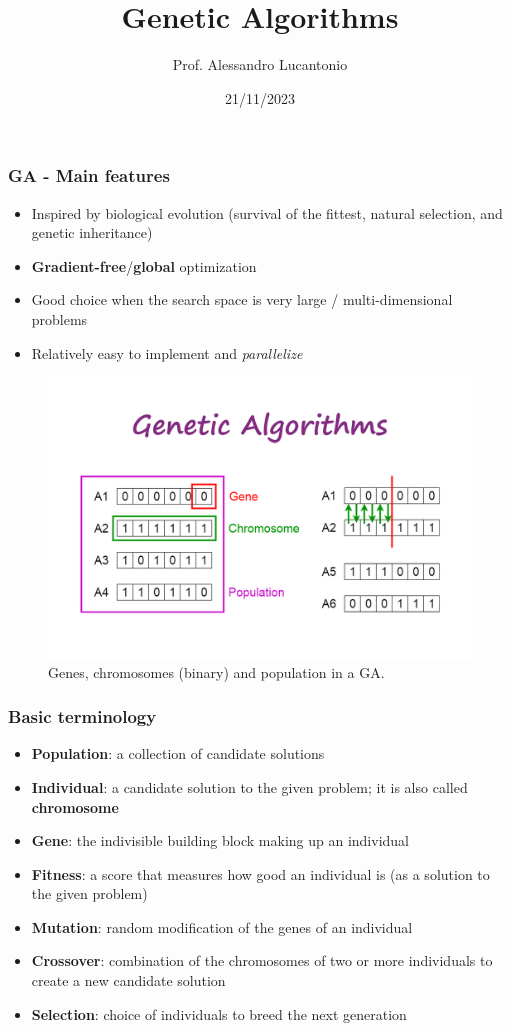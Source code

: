 \documentclass{beamer}
\title{Genetic Algorithms}
\author{Prof. Alessandro Lucantonio}
\institute{Aarhus University}
\date{21/11/2023}
\begin{document}
	\frame{\titlepage}
	
	\begin{frame}
		\frametitle{GA - Main features}
		\begin{itemize}
			\setlength\itemsep{5mm}
			\item Inspired by biological evolution (survival of the fittest, natural selection, and genetic inheritance)
			\item \textbf{Gradient-free}/\textbf{global} optimization
			\item Good choice when the search space is very large / multi-dimensional problems
			\item Relatively easy to implement and \textit{parallelize}
		\end{itemize}
	\end{frame}
	

	\begin{frame}
		\begin{figure}
			\centering
			\includegraphics[scale=0.23]{images/ga}
			\caption{Genes, chromosomes (binary) and population in a GA.}
		\end{figure}
	\end{frame}

	

	\begin{frame}
		\frametitle{Basic terminology}
		\begin{itemize}
			\item \textbf{Population}: a collection of candidate solutions
			\item \textbf{Individual}: a candidate solution to the given problem; it is also called \textbf{chromosome}
			\item \textbf{Gene}: the indivisible building block making up an individual
			\item \textbf{Fitness}: a score that measures how good an individual is (as a solution to the given problem)
			\item \textbf{Mutation}: random modification of the genes of an individual
			\item \textbf{Crossover}: combination of the chromosomes of two or more individuals to create a new candidate solution
			\item \textbf{Selection}: choice of individuals to breed the next generation
		\end{itemize}
	\end{frame}
\end{document}
